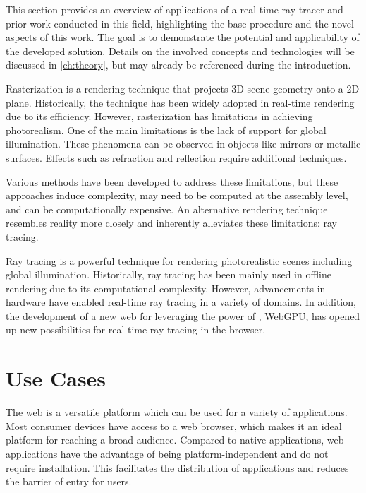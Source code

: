 
This section provides an overview of applications of a real-time ray tracer and prior work conducted in this field, highlighting the base procedure and the novel aspects of this work. The goal is to demonstrate the potential and applicability of the developed solution. Details on the involved concepts and technologies will be discussed in \autoref{ch:theory}, but may already be referenced during the introduction.

Rasterization is a rendering technique that projects 3D scene geometry onto a 2D plane. Historically, the technique has been widely adopted in real-time rendering due to its efficiency. However, rasterization has limitations in achieving photorealism. One of the main limitations is the lack of support for global illumination. These phenomena can be observed in objects like mirrors or metallic surfaces. Effects such as refraction and reflection require additional techniques.

Various methods have been developed to address these limitations, but these approaches induce complexity, may need to be computed at the assembly level, and can be computationally expensive. An alternative rendering technique resembles reality more closely and inherently alleviates these limitations: ray tracing.

Ray tracing is a powerful technique for rendering photorealistic scenes including global illumination. Historically, ray tracing has been mainly used in offline rendering due to its computational complexity. However, advancements in hardware have enabled real-time ray tracing in a variety of domains. In addition, the development of a new web  for leveraging the power of , WebGPU, has opened up new possibilities for real-time ray tracing in the browser.

\section{Use Cases}

The web is a versatile platform which can be used for a variety of applications. Most consumer devices have access to a web browser, which makes it an ideal platform for reaching a broad audience. Compared to native applications, web applications have the advantage of being platform-independent and do not require installation. This facilitates the distribution of applications and reduces the barrier of entry for users.

